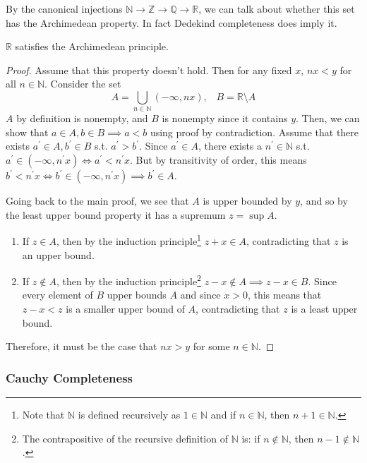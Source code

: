     By the canonical injections $\mathbb{N} \rightarrow \mathbb{Z} \rightarrow \mathbb{Q} \rightarrow \mathbb{R}$, we can talk about whether this set has the Archimedean property. In fact Dedekind completeness does imply it. 

    \begin{theorem}
      $\mathbb{R}$ satisfies the Archimedean principle. 
    \end{theorem}
    \begin{proof}
      Assume that this property doesn't hold. Then for any fixed $x$, $nx < y$ for all $n \in \mathbb{N}$. Consider the set 
      \begin{equation}
        A = \bigcup_{n \in \mathbb{N}} (-\infty, nx), \;\;\; B = \mathbb{R} \setminus A
      \end{equation}
      $A$ by definition is nonempty, and $B$ is nonempty since it contains $y$. Then, we can show that $a \in A, b \in B \implies a < b$ using proof by contradiction. Assume that there exists $a^\prime \in A, b^\prime \in B$ s.t. $a^\prime > b^\prime$. Since $a^\prime \in A$, there exists a $n^\prime \in \mathbb{N}$ s.t. $a^\prime \in (-\infty, n^\prime x) \iff a^\prime < n^\prime x$. But by transitivity of order, this means $b^\prime < n^\prime x \iff b^\prime \in (-\infty, n^\prime x) \implies b^\prime \in A$. 

      Going back to the main proof, we see that $A$ is upper bounded by $y$, and so by the least upper bound property it has a supremum $z = \sup{A}$. 
      \begin{enumerate}
        \item If $z \in A$, then by the induction principle\footnote{Note that $\mathbb{N}$ is defined recursively as $1 \in \mathbb{N}$ and if $n \in \mathbb{N}$, then $n+1 \in \mathbb{N}$. } $z + x \in A$, contradicting that $z$ is an upper bound. 
        \item If $z \not\in A$, then by the induction principle\footnote{The contrapositive of the recursive definition of $\mathbb{N}$ is: if $n \not\in \mathbb{N}$, then $n-1 \not\in \mathbb{N}$.} $z-x \not\in A \implies z-x \in B$. Since every element of $B$ upper bounds $A$ and since $x > 0$, this means that $z-x < z$ is a smaller upper bound of $A$, contradicting that $z$ is a least upper bound. 
      \end{enumerate}
      Therefore, it must be the case that $nx > y$ for some $n \in \mathbb{N}$. 
    \end{proof}

  \subsubsection{Cauchy Completeness} 

